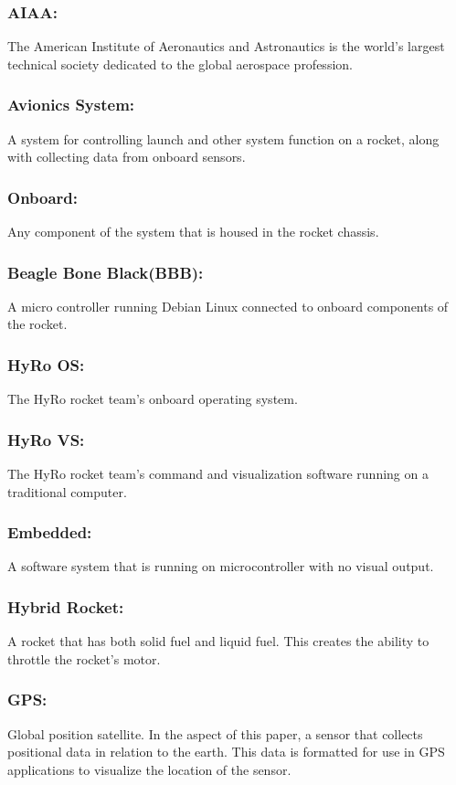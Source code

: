 \documentclass[10pt,draftclsnofoot,onecolumn,compsoc]{IEEEtran}
\begin{document}
\subsubsection{\bf AIAA:} The American Institute of Aeronautics and Astronautics is the world's largest technical society dedicated to the global aerospace profession.
\subsubsection{\bf Avionics System:}  A system for controlling launch and other system function on a rocket, along with collecting data from onboard sensors.
\subsubsection{\bf Onboard:} Any component of the system that is housed in the rocket chassis.
\subsubsection{\bf Beagle Bone Black(BBB):}   A micro controller running Debian Linux connected to onboard components of the rocket.
\subsubsection{\bf HyRo OS:}  The HyRo rocket team's onboard operating system.
\subsubsection{\bf HyRo VS:} The HyRo rocket team's command and visualization software running on a traditional computer.
\subsubsection{\bf Embedded:} A software system that is running on microcontroller with no visual output.
\subsubsection{\bf Hybrid Rocket:} A rocket that has both solid fuel and liquid fuel. This creates the ability to throttle the rocket's motor.
\subsubsection{\bf GPS:} Global position satellite. In the aspect of this paper, a sensor that collects positional data in relation to the earth. This data is formatted for use in GPS applications to visualize the location of the sensor.
\end{document}
